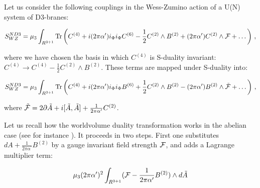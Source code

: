 \documentclass[12pt,a4paper]{article}
\begin{document}
Let us consider the following couplings in the Wess-Zumino action
of a U(N) system of D3-branes:


\begin{equation}
\label{D3weak}
S^{ND3}_{WZ}=\mu_3\int_{R^{3+1}}{\rm Tr}\left(C^{(4)}+
i(2\pi\alpha^\prime)i_\Phi i_\Phi C^{(6)}-\frac12 C^{(2)}\wedge
B^{(2)}+(2\pi\alpha^\prime)C^{(2)}\wedge {\cal F}+\dots\right)\, ,
\end{equation}

\noindent where we have chosen the basis in which $C^{(4)}$ is
S-duality invariant: $C^{(4)}\rightarrow C^{(4)}-\frac12 C^{(2)}
\wedge B^{(2)}$.
These terms are mapped under S-duality into:

\begin{equation}
\label{D3strong}
S^{ND3}_{WZ}=\mu_3\int_{R^{3+1}}{\rm Tr}\left(C^{(4)}+
i(2\pi\alpha^\prime)i_\Phi i_\Phi B^{(6)}+\frac12 C^{(2)}
\wedge B^{(2)}-(2\pi\alpha^\prime)B^{(2)}\wedge {\tilde {\cal F}}
+\dots\right)\, ,
\end{equation}

\noindent where ${\tilde {\cal F}}=2\partial {\tilde A}+
i[{\tilde A},{\tilde A}]+\frac{1}{2\pi\alpha^\prime} C^{(2)}$.

Let us recall how the worldvolume duality transformation
works in the abelian case (see for instance \cite{Tseytlin2}).
It proceeds in two steps. First one substitutes 
$dA+\frac{1}{2\pi\alpha^\prime}B^{(2)}$ by 
a gauge invariant field strength ${\cal F}$,
and adds a Lagrange multiplier term:

\begin{equation}
\label{multipli}
\mu_3 (2\pi\alpha^\prime)^2
\int_{R^{3+1}}({\cal F}-\frac{1}{2\pi\alpha^\prime}
B^{(2)})\wedge d{\tilde A}
\end{equation}
\end{document}
